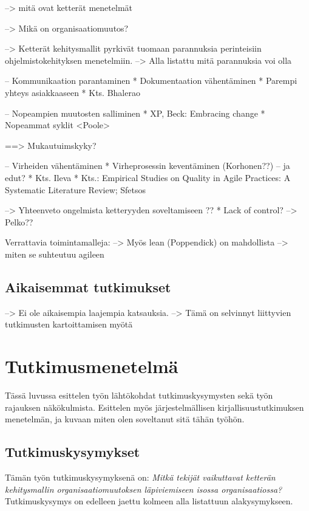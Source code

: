 --> mitä ovat ketterät menetelmät

--> Mikä on organisaatiomuutos?

--> Ketterät kehitysmallit pyrkivät tuomaan parannuksia perinteisiin
ohjelmistokehityksen menetelmiin. --> Alla listattu mitä parannuksia voi olla

-- Kommunikaation parantaminen
  * Dokumentaation vähentäminen
  * Parempi yhteys asiakkaaseen
  * Kts. Bhalerao

-- Nopeampien muutosten salliminen
  * XP, Beck: Embracing change
  * Nopeammat syklit <Poole>

==> Mukautuimskyky?

-- Virheiden vähentäminen
  * Virheprosessin keventäminen (Korhonen??) -- ja edut?
  * Kts. Ileva
  * Kts.: Empirical Studies on Quality in Agile Practices: A Systematic Literature Review; Sfetsos

--> Yhteenveto ongelmista ketteryyden soveltamiseen ??
  * Lack of control? --> Pelko??

Verrattavia toimintamalleja:
--> Myös lean (Poppendick) on mahdollista
--> miten se suhteutuu agileen

\subsection{Aikaisemmat tutkimukset}

--> Ei ole aikaisempia laajempia katsauksia.
--> Tämä on selvinnyt liittyvien tutkimusten kartoittamisen myötä



\section{Tutkimusmenetelmä}
\label{sec:menetelma}

Tässä luvussa esittelen työn lähtökohdat tutkimuskysymysten sekä työn rajauksen
näkökulmista. Esittelen myös järjestelmällisen kirjallisuustutkimuksen
menetelmän, ja kuvaan miten olen soveltanut sitä tähän työhön.

\subsection{Tutkimuskysymykset}

Tämän työn tutkimuskysymyksenä on: \textit{Mitkä tekijät vaikuttavat ketterän
kehitysmallin organisaatiomuutoksen läpiviemiseen isossa organisaatiossa?}
Tutkimuskysymys on edelleen jaettu kolmeen alla listattuun alakysymykseen.

